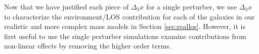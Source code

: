 Now that we have justified each piece of $\Delta_3 x$ for a single perturber, we use $\Delta_3 x$ to characterize the environment/LOS contribution for each of the galaxies in our realistic and more complex mass models in Section \ref{sec:reallos}. However, it is first useful to use the single perturber simulations examine contributions from non-linear effects by removing the higher order terms.